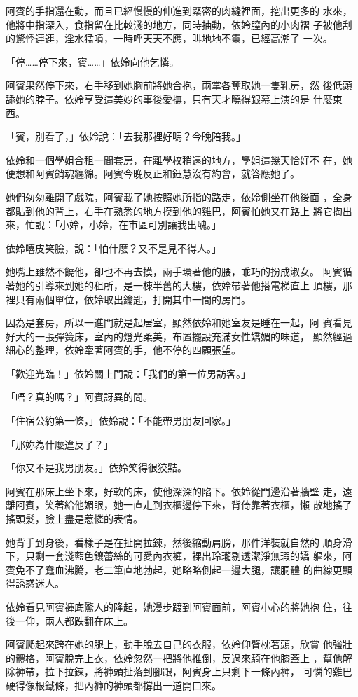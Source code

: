 阿賓的手指還在動，而且已經慢慢的伸進到緊密的肉縫裡面，挖出更多的
水來，他將中指深入，食指留在比較淺的地方，同時抽動，依姈膣內的小肉褶
子被他刮的驚悸連連，淫水猛噴，一時呼天天不應，叫地地不靈，已經高潮了
一次。

「停……停下來，賓……」依姈向他乞憐。

阿賓果然停下來，右手移到她胸前將她合抱，兩掌各奪取她一隻乳房，然
後低頭舔她的脖子。依姈享受這美妙的事後愛撫，只有天才曉得銀幕上演的是
什麼東西。

「賓，別看了，」依姈說：「去我那裡好嗎？今晚陪我。」

依姈和一個學姐合租一間套房，在離學校稍遠的地方，學姐這幾天恰好不
在，她便想和阿賓銷魂纏綿。阿賓今晚反正和鈺慧沒有約會，就答應她了。

她們匆匆離開了戲院，阿賓載了她按照她所指的路走，依姈側坐在他後面
，全身都貼到他的背上，右手在熟悉的地方摸到他的雞巴，阿賓怕她又在路上
將它掏出來，忙說：「小姈，小姈，在市區可別讓我出醜。」

依姈嘻皮笑臉，說：「怕什麼？又不是見不得人。」

她嘴上雖然不饒他，卻也不再去摸，兩手環著他的腰，乖巧的扮成淑女。
阿賓循著她的引導來到她的租所，是一棟半舊的大樓，依姈帶著他搭電梯直上
頂樓，那裡只有兩個單位，依姈取出鑰匙，打開其中一間的房門。

因為是套房，所以一進門就是起居室，顯然依姈和她室友是睡在一起，阿
賓看見好大的一張彈簧床，室內的燈光柔美，布置擺設充滿女性嬌媚的味道，
顯然經過細心的整理，依姈牽著阿賓的手，他不停的四顧張望。

「歡迎光臨！」依姈關上門說：「我們的第一位男訪客。」

「唔？真的嗎？」阿賓訝異的問。

「住宿公約第一條，」依姈說：「不能帶男朋友回家。」

「那妳為什麼違反了？」

「你又不是我男朋友。」依姈笑得很狡黠。

阿賓在那床上坐下來，好軟的床，使他深深的陷下。依姈從門邊沿著牆壁
走，遠離阿賓，笑著給他媚眼，她一直走到衣櫃邊停下來，背倚靠著衣櫃，懶
散地搖了搖頭髮，臉上盡是惹憐的表情。

她背手到身後，看樣子是在扯開拉鍊，然後縮動肩膀，那件洋裝就自然的
順身滑下，只剩一套淺藍色鑲蕾絲的可愛內衣褲，裸出玲瓏剔透潔淨無瑕的嬌
軀來，阿賓免不了蠢血沸騰，老二筆直地勃起，她略略側起一邊大腿，讓胴體
的曲線更顯得誘惑迷人。

依姈看見阿賓褲底驚人的隆起，她漫步踱到阿賓面前，阿賓小心的將她抱
住，往後一仰，兩人都跌翻在床上。

阿賓爬起來跨在她的腿上，動手脫去自己的衣服，依姈仰臂枕著頭，欣賞
他強壯的體格，阿賓脫完上衣，依姈忽然一把將他推倒，反過來騎在他膝蓋上
，幫他解除褲帶，拉下拉鍊，將褲頭扯落到腳跟，阿賓身上只剩下一條內褲，
可憐的雞巴硬得像根鐵條，把內褲的褲頭都撐出一道開口來。

